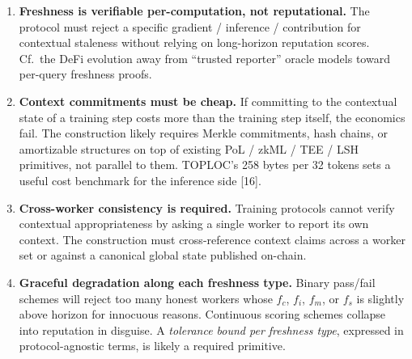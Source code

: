 \documentclass[11pt]{article}
\begin{document}
\begin{enumerate}
\item \textbf{Freshness is verifiable per-computation, not reputational.} The protocol must reject a specific gradient / inference / contribution for contextual staleness without relying on long-horizon reputation scores. Cf.\ the DeFi evolution away from ``trusted reporter'' oracle models toward per-query freshness proofs.

\item \textbf{Context commitments must be cheap.} If committing to the contextual state of a training step costs more than the training step itself, the economics fail. The construction likely requires Merkle commitments, hash chains, or amortizable structures on top of existing PoL / zkML / TEE / LSH primitives, not parallel to them. TOPLOC's 258 bytes per 32 tokens sets a useful cost benchmark for the inference side [16].

\item \textbf{Cross-worker consistency is required.} Training protocols cannot verify contextual appropriateness by asking a single worker to report its own context. The construction must cross-reference context claims across a worker set or against a canonical global state published on-chain.

\item \textbf{Graceful degradation along each freshness type.} Binary pass/fail schemes will reject too many honest workers whose $f_c$, $f_i$, $f_m$, or $f_s$ is slightly above horizon for innocuous reasons. Continuous scoring schemes collapse into reputation in disguise. A \emph{tolerance bound per freshness type}, expressed in protocol-agnostic terms, is likely a required primitive.


\end{enumerate}
\end{document}

